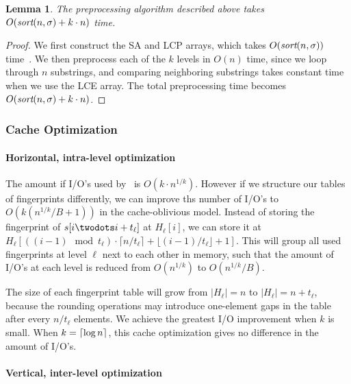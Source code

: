 \documentclass[a4]{article}
\newtheorem{lemma}{Lemma}
\begin{document}
\begin{lemma}
The preprocessing algorithm described above takes $O(\textit{sort}(n,\sigma) + k\cdot n)$ time.
\end{lemma}

\begin{proof}
We first construct the SA and LCP arrays, which takes $O(\textit{sort}(n,\sigma))$ time~\cite{sort-complexity}. We then preprocess each of the $k$ levels in $O(n)$ time, since we loop through $n$ substrings, and comparing neighboring substrings takes constant time when we use the LCE array. The total preprocessing time becomes $O(\textit{sort}(n,\sigma) + k\cdot n)$.
\end{proof}

\ifreport

\subsubsection{Cache Optimization\label{sec:fingerprint-cache}}

\paragraph{Horizontal, intra-level optimization}

The amount if I/O's used by \fprintk\ is $O(k\cdot n^{1/k})$. However if we structure our tables of fingerprints differently, we can improve ths number of I/O's to $O(k(n^{1/k}/B+1))$ in the cache-oblivious model. Instead of storing the fingerprint of $s[i\twodots i+t_\ell]$ at $H_\ell[i]$, we can store it at $H_\ell[((i-1)\mod t_\ell)\cdot\lceil n/t_\ell\rceil+\lfloor (i-1)/t_\ell\rfloor+1]$. This will group all used fingerprints at level $\ell$ next to each other in memory, such that the amount of I/O's at each level is reduced from $O(n^{1/k})$ to $O(n^{1/k}/B)$.

The size of each fingerprint table will grow from $|H_\ell| = n$ to $|H_\ell| = n+t_\ell$, because the rounding operations may introduce one-element gaps in the table after every $n/t_\ell$ elements. We achieve the greatest I/O improvement when $k$ is small. When $k=\lceil\log n\rceil$, this cache optimization gives no difference in the amount of I/O's.

\paragraph{Vertical, inter-level optimization}
\end{document}

